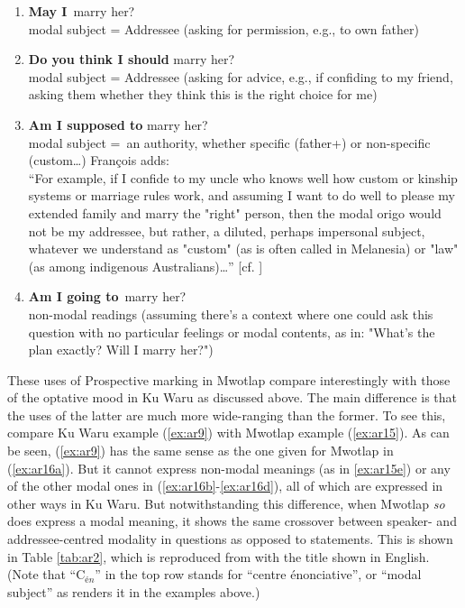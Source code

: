 \documentclass[output=paper]{langsci/langscibook}
\begin{document}
\begin{enumerate}[label=\alph*)]
	\item \textbf{May I} marry her? \\modal subject = Addressee (asking for permission, e.g., to own father)
	\item \textbf{Do you think I should} marry her? \\modal subject = Addressee (asking for advice, e.g., if confiding to my friend, asking them whether they think this is the right choice for me)
  	\item \textbf{Am I supposed to} marry her? \\modal subject = an authority, whether specific (father+) or non-specific (custom…) François adds:\\ “For example, if I confide to my uncle who knows well how custom or kinship systems or marriage rules work, and assuming I want to do well to please my extended family and marry the "right" person, then the modal origo would not be my addressee, but rather, a diluted, perhaps impersonal subject, whatever we understand as "custom" (as is often called in Melanesia) or "law" (as among indigenous Australians)…” [cf. \citealt[229]{Francois2003}]
  	\item \textbf{Am I going to} marry her? \\ non-modal readings (assuming there's a context where one could ask this question with no particular feelings or modal contents, as in: "What's the plan exactly? Will I marry her?")
\end{enumerate}

These uses of Prospective marking in Mwotlap compare interestingly with those of the optative mood in Ku Waru as discussed above. The main difference is that the uses of the latter are much more wide-ranging than the former. To see this, compare Ku Waru example (\ref{ex:ar9}) with Mwotlap example (\ref{ex:ar15}). As can be seen, (\ref{ex:ar9}) has the same sense as the one given for Mwotlap in (\ref{ex:ar16a}).  But it cannot express non-modal meanings (as in \ref{ex:ar15e}) or any of the other modal ones in  (\ref{ex:ar16b}-\ref{ex:ar16d}), all of which are expressed in other ways in Ku Waru. But notwithstanding this difference, when Mwotlap \textit{so} does express a modal meaning, it shows the same crossover between speaker- and addressee-centred modality in questions as opposed to statements. This is shown in Table \ref{tab:ar2}, which is reproduced from \cite{Francois2003} with the title shown in English. (Note that “C$_{én}$” in the top row stands for “centre énonciative”, or “modal subject” as \citeauthor{Francois2003} renders it in the examples above.)
\end{document}
